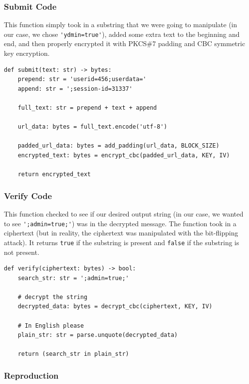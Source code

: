\documentclass[11pt]{article}
\begin{document}
\subsubsection*{Submit Code}

This function simply took in a substring that we were going to manipulate (in our case, we chose \verb|'ydmin=true'|), added some extra text to the beginning and end, and then properly encrypted it with PKCS\#7 padding and CBC symmetric key encryption.

\begin{lstlisting}
def submit(text: str) -> bytes:
    prepend: str = 'userid=456;userdata='
    append: str = ';session-id=31337'

    full_text: str = prepend + text + append 
    
    url_data: bytes = full_text.encode('utf-8')

    padded_url_data: bytes = add_padding(url_data, BLOCK_SIZE)
    encrypted_text: bytes = encrypt_cbc(padded_url_data, KEY, IV)

    return encrypted_text
\end{lstlisting}

\subsubsection*{Verify Code}

This function checked to see if our desired output string (in our case, we wanted to see \verb|';admin=true;'|) was in the decrypted message. The function took in a ciphertext (but in reality, the ciphertext was manipulated with the bit-flipping attack). It returns \verb|true| if the substring is present and \verb|false| if the substring is not present.

\begin{lstlisting}
def verify(ciphertext: bytes) -> bool:
    search_str: str = ';admin=true;'

    # decrypt the string  
    decrypted_data: bytes = decrypt_cbc(ciphertext, KEY, IV)

    # In English please
    plain_str: str = parse.unquote(decrypted_data)

    return (search_str in plain_str)

\end{lstlisting}

\subsubsection*{Reproduction}
\end{document}

